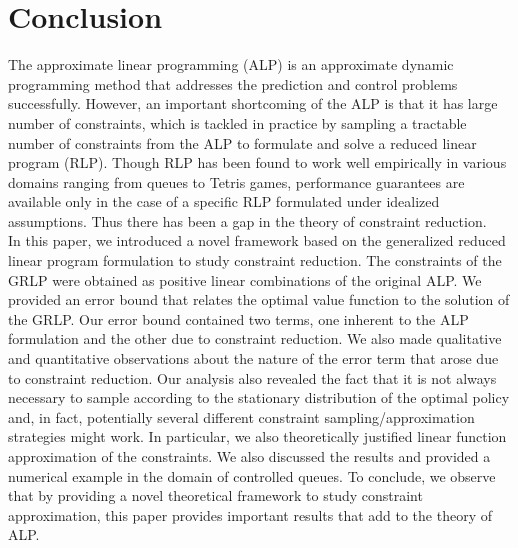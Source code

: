 \section{Conclusion}
The approximate linear programming (ALP) is an approximate dynamic programming method that addresses the prediction and control problems successfully. However, an important shortcoming of the ALP is that it has large number of constraints, which is tackled in practice by sampling a tractable number of constraints from the ALP to formulate and solve a reduced linear program (RLP). Though RLP has been found to work well empirically in various domains ranging from queues to Tetris games, performance guarantees are available only in the case of a specific RLP formulated under idealized assumptions. Thus there has been a gap in the theory of constraint reduction.\\
In this paper, we introduced a novel framework based on the generalized reduced linear program formulation to study constraint reduction. The constraints of the GRLP were obtained as positive linear combinations of the original ALP. We provided an error bound that relates the optimal value function to the solution of the GRLP. Our error bound contained two terms, one inherent to the ALP formulation and the other due to constraint reduction. We also made qualitative and quantitative observations about the nature of the error term that arose due to constraint reduction. Our analysis also revealed the fact that it is not always necessary to sample according to the stationary distribution of the optimal policy and, in fact, potentially several different constraint sampling/approximation strategies might work. In particular, we also theoretically justified linear function approximation of the constraints. We also discussed the results and provided a numerical example in the domain of controlled queues. To conclude, we observe that by providing a novel theoretical framework to study constraint approximation, this paper provides important results that add to the theory of ALP.


